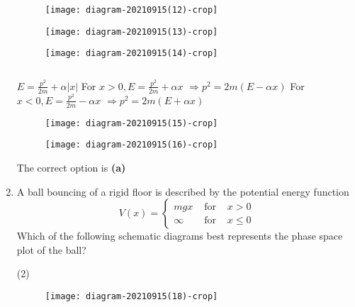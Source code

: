 \begin{enumerate}
\begin{tasks}
\begin{figure}[H]
	\end{figure}
	\task[\textbf{B.}]\begin{figure}[H]
		\centering
		\texttt{[image: diagram-20210915(12)-crop]}
	\end{figure}
	\task[\textbf{C.}]\begin{figure}[H]
		\centering
		\texttt{[image: diagram-20210915(13)-crop]}
	\end{figure}
	\task[\textbf{D.}]\begin{figure}[H]
		\centering
		\texttt{[image: diagram-20210915(14)-crop]}
	\end{figure}
\end{tasks}
\begin{answer}$\left. \right. $\\
\begin{minipage}{0.5\textwidth}
 $E=\frac{p^{2}}{2 m}+\alpha|x|$
	For $x>0, E=\frac{p^{2}}{2 m}+\alpha x$ $\Rightarrow p^{2}=2 m(E-\alpha x)$
	For $x<0, E=\frac{p^{2}}{2 m}-\alpha x$ $\Rightarrow p^{2}=2 m(E+\alpha x)$
\end{minipage}
\begin{minipage}{0.5\textwidth}
\begin{figure}[H]
	\centering
	\texttt{[image: diagram-20210915(15)-crop]}
\end{figure}
\begin{figure}[H]
	\centering
	\texttt{[image: diagram-20210915(16)-crop]}
\end{figure}
\end{minipage}
The correct option is \textbf{(a)}	
\end{answer}
	\item A ball bouncing of a rigid floor is described by the potential energy function
	$$
	V(x)=\left\{\begin{array}{lll}
	m g x & \text { for } & x>0 \\
	\infty & \text { for } & x \leq 0
	\end{array}\right.
	$$
	Which of the following schematic diagrams best represents the phase space plot of the ball?
	{}
\begin{tasks}(2)
	\task[\textbf{A.}]\begin{figure}[H]
		\centering
		\texttt{[image: diagram-20210915(18)-crop]}
	\end{figure}
	\task[\textbf{B.}]\begin{figure}[H]

\end{figure}
\end{tasks}
\end{enumerate}
